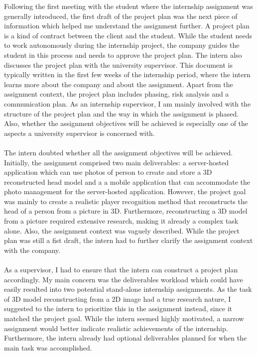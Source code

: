 Following the first meeting with the student where the  internship assignment was generally introduced, the first draft of the project plan was the next piece of information which helped me understand the assignment further. 
A project plan is a kind of contract between the client and the student. 
While the student needs to work autonomously during the internship project, the company guides the student in this process and needs to approve the project plan. 
The intern also discusses the project plan with the university supervisor.
This document is typically written in the first few weeks of the internship period, where the intern learns more about the company and about the assignment. 
Apart from the assignment context, the project plan includes phasing, risk analysis and a communication plan.
As an internship supervisor, I am mainly involved with the structure of the project plan and the way in which the assignment is phased. 
Also, whether the assignment objectives will be achieved is especially one of the aspects a university supervisor is concerned with.\\\\
The intern doubted whether all the assignment objectives will be achieved. 
Initially, the assignment comprised two main deliverables: a server-hosted application which can use photos of person to create and store a 3D reconstructed head model and a a mobile application that can accommodate the photo management for the server-hosted application. 
However, the project goal was mainly to create a realistic player recognition method that reconstructs the head of a person from a picture in 3D. 
Furthermore, reconstructing a 3D model from a picture required extensive research, making it already a complex task alone.
Also, the assignment context was vaguely described. While the project plan was still a fist draft, the intern had to further clarify the assignment context with the company.\\\\
As a supervisor, I had to ensure that the intern can construct a project plan accordingly. 
My main concern was the deliverables workload which could have easily resulted into two potential stand-alone internship assignments. 
As the task of 3D model reconstructing from a 2D image had a true research nature, I suggested to the intern to prioritize this in the assignment instead, since it matched the project goal. 
While the intern seemed highly motivated, a narrow assignment would better indicate realistic achievements of the internship. 
Furthermore, the intern already had optional deliverables planned for when the main task was accomplished. 
